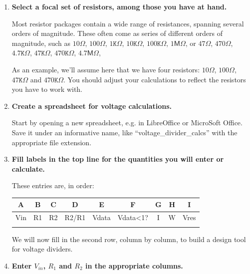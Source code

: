 \begin{enumerate}
	\item \textbf{Select a focal set of resistors, among those you have at hand.}
	
	Most resistor packages contain a wide range of resistances, spanning several orders of magnitude. 
	These often come as series of different orders of magnitude, such as $10 \Omega$, $100 \Omega$, $1\mathtt{K} \Omega$, $10\mathtt{K} \Omega$, $100\mathtt{K} \Omega$, $1 \mathsf{M} \Omega$, or $47 \Omega$, $470 \Omega$, $4.7\mathtt{K} \Omega$, $47\mathtt{K} \Omega$, $470\mathtt{K} \Omega$, $4.7 \mathsf{M} \Omega$, \etc
	
	\smallskip
	As an example, we'll assume here that we have four resistors: $10 \Omega$, $100 \Omega$, $47\mathtt{K} \Omega$ and $470\mathtt{K} \Omega$. 
	You should adjust your calculations to reflect the resistors you have to work with.
	
	\item \textbf{Create a spreadsheet for voltage calculations.}
	
	Start by opening a new spreadsheet, e.g. in LibreOffice or MicroSoft Office. 
	Save it under an informative name, like ``voltage\_divider\_calcs'' with the appropriate file extension.
	
	\item \textbf{Fill labels in the top line for the quantities you will enter or calculate.}
	
	These entries are, in order:
	\begin{table}[H]
	\centering 
	\begin{small}
	\begin{tabular}{|c|c|c|c|c|c|c|c|c|}
		\hline 
		\textbf{A}  & \textbf{B} & \textbf{C} & \textbf{D} & \textbf{E} & \textbf{F} & \textbf{G} & \textbf{H} & \textbf{I} \\ 
		\hline 
		Vin  & R1 & R2 & R2/R1 & Vdata & Vdata<1? & I & W & Vres \\ 
		\hline 
		&  &  &  &  &  &  &  &  \\ 
		\hline 
	\end{tabular} 
	\end{small}
	\end{table}
	We will now fill in the second row, column by column, to build a design tool for voltage dividers.

	\item \textbf{Enter $V_{in}$, $R_1$ and $R_2$ in the appropriate columns.}


\end{enumerate}
